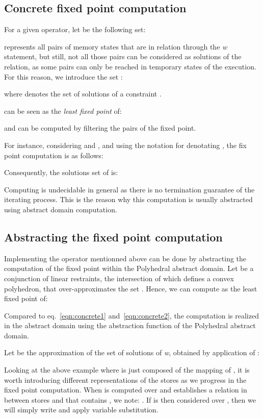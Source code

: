 \documentclass[submission,copyright,creativecommons]{eptcs}
\begin{document}
\subsection{Concrete fixed point computation}
For a given  operator, let  be the following set:


\noindent
 represents all pairs of memory states that are in relation through the {\it w} statement, but still, not all those pairs can be considered as solutions of the relation, as some pairs can only be reached in temporary states of the execution. For this reason, we introduce the set :

  

\noindent
  where  denotes the set of solutions of a constraint .

\noindent
 can be seen as the {\it least fixed point} of:

and  can be computed by filtering the pairs of the fixed point.

\noindent
For instance, considering  and , and
using the notation  for denotating ,
the fix point computation is as follows: 



\noindent
Consequently, the solutions set  of  is:


\noindent
Computing  is undecidable in general as there is no termination guarantee of the iterating process. This is the reason why this computation is usually abstracted using abstract domain computation.

\subsection{Abstracting the fixed point computation}

Implementing the  operator mentionned above can be done by 
abstracting the computation of the fixed point within the Polyhedral abstract domain.
Let  be a conjunction of linear restraints, the intersection of which defines a convex polyhedron, that over-approximates the set .
Hence, we can compute  as the least fixed point of:

Compared to eq.~\ref{eqn:concrete1} and~\ref{eqn:concrete2}, the
computation is realized in the abstract domain using  the abstraction function of the Polyhedral abstract domain.



\noindent
Let  be the approximation of the set of solutions of \textit{w}, obtained by application of :


\noindent
Looking at the above example where  is just composed of the mapping of , 
it is worth introducing different representations of the stores as we progress in the fixed point computation. 
When  is computed over  and establishes a relation in between stores  and  that contains , we note: . If  is then
considered over , then we will simply write  and apply variable substitution. 
\end{document}
